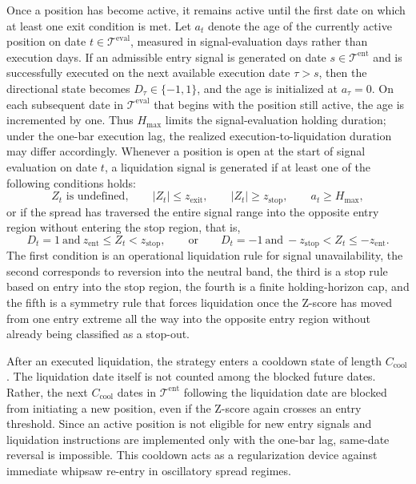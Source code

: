 \documentclass[11pt,a4paper]{article}
\begin{document}
Once a position has become active, it remains active until the first date on
which at least one exit condition is met. Let \(a_t\) denote the age of the
currently active position on date
\(t \in \mathcal T^{\mathrm{eval}}\), measured in signal-evaluation days rather
than execution days. If an admissible entry signal is generated on date
\(s \in \mathcal T^{\mathrm{ent}}\) and is successfully executed on the next
available execution date \(\tau>s\), then the directional state becomes
\(D_\tau \in \{-1,1\}\), and the age is initialized at \(a_\tau=0\). On each
subsequent date in \(\mathcal T^{\mathrm{eval}}\) that begins with the position
still active, the age is incremented by one. Thus \(H_{\max}\) limits the
signal-evaluation holding duration; under the one-bar execution lag, the
realized execution-to-liquidation duration may differ accordingly. Whenever a
position is open at the start of signal evaluation on date \(t\), a
liquidation signal is generated if at least one of the following conditions
holds:
\[
  Z_t \text{ is undefined},
  \qquad
  |Z_t| \le z_{\mathrm{exit}},
  \qquad
  |Z_t| \ge z_{\mathrm{stop}},
  \qquad
  a_t \ge H_{\max},
\]
or if the spread has traversed the entire signal range into the opposite entry
region without entering the stop region, that is,
\[
  D_t=1 \ \text{and}\ z_{\mathrm{ent}} \le Z_t < z_{\mathrm{stop}},
  \qquad \text{or} \qquad
  D_t=-1 \ \text{and}\ -z_{\mathrm{stop}} < Z_t \le -z_{\mathrm{ent}}.
\]
The first condition is an operational liquidation rule for signal
unavailability, the second corresponds to reversion into the neutral band, the
third is a stop rule based on entry into the stop region, the fourth is a
finite holding-horizon cap, and the fifth is a symmetry rule that forces
liquidation once the Z-score has moved from one entry extreme all the way into
the opposite entry region without already being classified as a stop-out.

After an executed liquidation, the strategy enters a cooldown state of length
\(C_{\mathrm{cool}}\). The liquidation date itself is not counted among the
blocked future dates. Rather, the next \(C_{\mathrm{cool}}\) dates in
\(\mathcal T^{\mathrm{ent}}\) following the liquidation date are blocked from
initiating a new position, even if the Z-score again crosses an entry
threshold. Since an active position is not eligible for new entry signals and
liquidation instructions are implemented only with the one-bar lag, same-date
reversal is impossible. This cooldown acts as a regularization device against
immediate whipsaw re-entry in oscillatory spread regimes.
\end{document}
